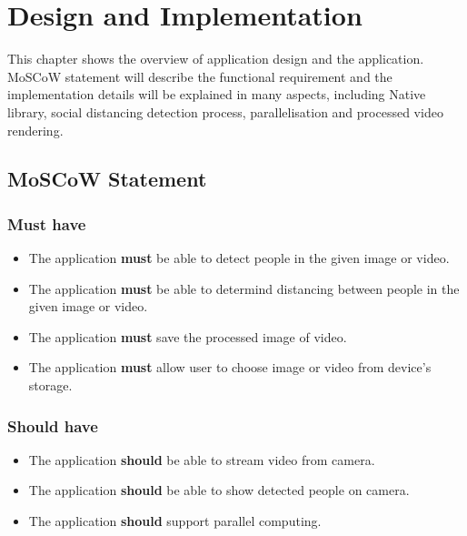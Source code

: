 \chapter{Design and Implementation}\label{implement}

    This chapter shows the overview of application design and the application.
    MoSCoW statement will describe the functional requirement and the implementation details will be explained in many aspects,
    including Native library, social distancing detection process, parallelisation and processed video rendering.

    \section{MoSCoW Statement}

        \subsection{Must have}
            \begin{itemize}
                \setlength\itemsep{1em}
                \item The application \textbf{must} be able to detect people in the given image or video.
                \item The application \textbf{must} be able to determind distancing between people in the given image or video.
                \item The application \textbf{must} save the processed image of video.
                \item The application \textbf{must} allow user to choose image or video from device's storage.
            \end{itemize}

        \subsection{Should have}
            \begin{itemize}
                \item The application \textbf{should} be able to stream video from camera.
                \item The application \textbf{should} be able to show detected people on camera.
                \item The application \textbf{should} support parallel computing.
            \end{itemize}

